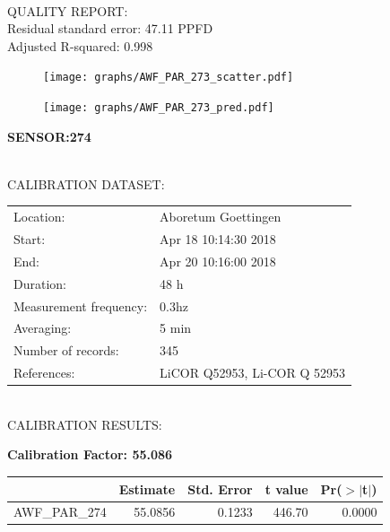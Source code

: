 \documentclass[oneside]{report}
\begin{document}
\hrulefill\\
QUALITY REPORT:\\
Residual standard error: 47.11 PPFD\\
Adjusted R-squared: 0.998



\begin{figure}[H]
  \centering
  \texttt{[image: graphs/AWF\_PAR\_273\_scatter.pdf]}
\end{figure}




\begin{figure}[H]
  \centering
  \texttt{[image: graphs/AWF\_PAR\_273\_pred.pdf]}
\end{figure}

\pagebreak


\begin{center}
\large{\textbf{SENSOR:274}}\\
\end{center}

\hrulefill\\
CALIBRATION DATASET:\\
\begin{table}[h!]
  \centering
  \label{tab:table1}
  \begin{tabular}{ll}
    Location: & Aboretum Goettingen\\ 
    
    
    Start:  & Apr 18 10:14:30 2018 \\
    End:   & Apr 20 10:16:00 2018\\ 
    Duration: & 48 h\\
    Measurement frequency: & 0.3hz\\
    Averaging:  &5 min\\
    Number of records: & 345 \\
    References: & LiCOR Q52953, Li-COR Q 52953 \\
  \end{tabular}
\end{table}

\hrulefill\\
CALIBRATION RESULTS:\\


\begin{center}
\textbf{\large{Calibration Factor: 55.086}}\\
\end{center}
\begin{table}[ht]
\centering
\begin{tabular}{rrrrr}
  \hline
 & Estimate & Std. Error & t value & Pr($>$$|$t$|$) \\ 
  \hline
AWF\_PAR\_274 & 55.0856 & 0.1233 & 446.70 & 0.0000 \\ 
   \hline
\end{tabular}
\end{table}
\end{document}
